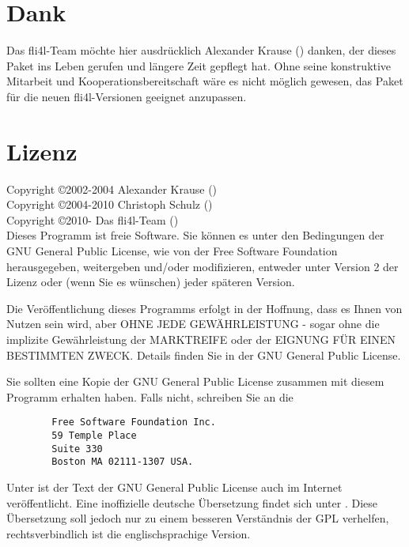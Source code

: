 \section{Dank}

Das fli4l-Team möchte hier ausdrücklich Alexander Krause
() danken, der dieses Paket ins Leben gerufen und
längere Zeit gepflegt hat. Ohne seine konstruktive Mitarbeit und
Kooperationsbereitschaft wäre es nicht möglich gewesen, das Paket für die
neuen fli4l-Versionen geeignet anzupassen.

\section{Lizenz}

Copyright \copyright  2002-2004 Alexander Krause () \\
Copyright \copyright  2004-2010 Christoph Schulz () \\
Copyright \copyright  2010-     Das fli4l-Team () \\

Dieses Programm ist freie Software. Sie können es unter
den Bedingungen der GNU General Public License, wie von der
Free Software Foundation herausgegeben, weitergeben und/oder
modifizieren, entweder unter Version 2 der Lizenz oder (wenn
Sie es wünschen) jeder späteren Version.

Die Veröffentlichung dieses Programms erfolgt in der
Hoffnung, dass es Ihnen von Nutzen sein wird, aber OHNE JEDE
GEWÄHRLEISTUNG - sogar ohne die implizite Gewährleistung
der MARKTREIFE oder der EIGNUNG FÜR EINEN BESTIMMTEN ZWECK.
Details finden Sie in der GNU General Public License.

Sie sollten eine Kopie der GNU General Public License zusammen
mit diesem Programm erhalten haben. Falls nicht, schreiben Sie
an die

\begin{verbatim}
		Free Software Foundation Inc.
		59 Temple Place
		Suite 330
		Boston MA 02111-1307 USA.
\end{verbatim}

Unter  ist der Text der GNU General
Public License auch im Internet veröffentlicht. Eine
inoffizielle deutsche Übersetzung findet sich unter
.
Diese Übersetzung soll jedoch nur zu einem besseren Verständnis
der GPL verhelfen, rechtsverbindlich ist die englischsprachige Version.
